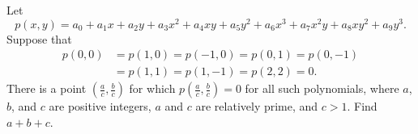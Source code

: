 Let
\[ p(x,y) = a_0 + a_1x + a_2y + a_3x^2 + a_4xy + a_5y^2 + a_6x^3 + a_7x^2y + a_8xy^2 + a_9y^3.
\]Suppose that
\begin{align*}p(0,0) &= p(1,0) = p( - 1,0) = p(0,1) = p(0, - 1) \\&= p(1,1) = p(1, - 1) = p(2,2) = 0.\end{align*}There is a point $ \left(\tfrac {a}{c},\tfrac {b}{c}\right)$ for which $ p\left(\tfrac {a}{c},\tfrac {b}{c}\right) = 0$ for all such polynomials, where $ a$, $ b$, and $ c$ are positive integers, $ a$ and $ c$ are relatively prime, and $ c > 1$.  Find $ a + b + c$.